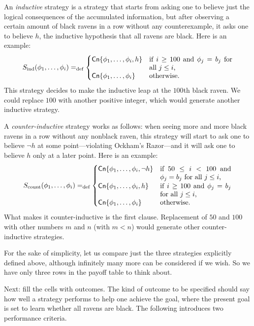 An {\em inductive} strategy is a strategy that starts from asking one to believe just the logical consequences of the accumulated information, but after observing a certain amount of black ravens in a row without any counterexample, it asks one to believe $h$, the inductive hypothesis that all ravens are black. Here is an example:
$$S_{\textrm{ind}} (\phi_1, \ldots, \phi_i) =_\text{def} 
	\begin{cases}
	\mathsf{Cn}\{\phi_1, \ldots, \phi_i, h\} & \parbox[t]{.35\textwidth}{if $i \ge 100$ and $\phi_{j} = b_{j}$ for all $j \le i$,}\\
	\mathsf{Cn}\{\phi_1, \ldots, \phi_i\} & \mbox{otherwise.}
	\end{cases}$$
This strategy decides to make the inductive leap at the $100$th black raven. We could replace $100$ with another positive integer, which would generate another inductive strategy.

A {\em counter-inductive} strategy works as follows: when seeing more and more black ravens in a row without any nonblack raven, this strategy will start to ask one to believe $\neg h$ at some point---violating Ockham's Razor---and it will ask one to believe $h$ only at a later point. Here is an example:
$$
S_{\textrm{count}} (\phi_1, \ldots, \phi_i) =_\text{def} 
	\begin{cases}
	\mathsf{Cn}\{\phi_1, \ldots, \phi_i, \neg h\} & \parbox[t]{.3\textwidth}{if $50 \le i < 100$ and $\phi_{j} = b_{j}$ for all $j \le i$,}\\

	\mathsf{Cn}\{\phi_1, \ldots, \phi_i, h\} & \parbox[t]{.3\textwidth}{if $i \ge 100$ and $\phi_{j} = b_{j}$ for all $j \le i$,}\\

	\mathsf{Cn}\{\phi_1, \ldots, \phi_i\} & \mbox{otherwise.}
	\end{cases}
$$
What makes it counter-inductive is the first clause. Replacement of $50$ and $100$ with other numbers $m$ and $n$ (with $m < n$) would generate other counter-inductive strategies. 

For the sake of simplicity, let us compare just the three strategies explicitly defined above, although infinitely many more can be considered if we wish. So we have only three rows in the payoff table to think about.

Next: fill the cells with outcomes. The kind of outcome to be specified should say how well a strategy performs to help one achieve the goal, where the present goal is set to learn whether all ravens are black. The following introduces two performance criteria.

